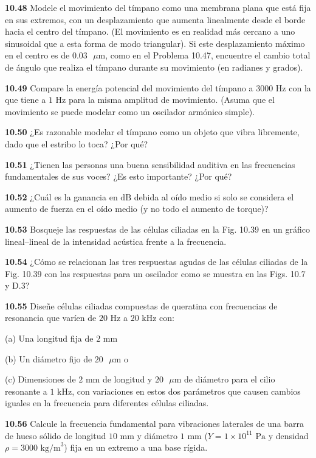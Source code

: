 \documentclass[12pt]{book}
\begin{document}
\noindent \textbf{10.48} Modele el movimiento del tímpano como una membrana plana que está fija en sus extremos, con un desplazamiento que aumenta linealmente desde el borde hacia el centro del tímpano. (El movimiento es en realidad más cercano a uno sinusoidal que a esta forma de modo triangular). Si este desplazamiento máximo en el centro es de $0.03\text{ }\mu\text{m}$, como en el Problema 10.47, encuentre el cambio total de ángulo que realiza el tímpano durante su movimiento (en radianes y grados).

\noindent \textbf{10.49} Compare la energía potencial del movimiento del tímpano a $3000\text{ Hz}$ con la que tiene a $1\text{ Hz}$ para la misma amplitud de movimiento. (Asuma que el movimiento se puede modelar como un oscilador armónico simple).

\noindent \textbf{10.50} ¿Es razonable modelar el tímpano como un objeto que vibra libremente, dado que el estribo lo toca? ¿Por qué?

\noindent \textbf{10.51} ¿Tienen las personas una buena sensibilidad auditiva en las frecuencias fundamentales de sus voces? ¿Es esto importante? ¿Por qué?

\noindent \textbf{10.52} ¿Cuál es la ganancia en $\text{dB}$ debida al oído medio si solo se considera el aumento de fuerza en el oído medio (y no todo el aumento de torque)?

\noindent \textbf{10.53} Bosqueje las respuestas de las células ciliadas en la Fig. 10.39 en un gráfico lineal--lineal de la intensidad acústica frente a la frecuencia.

\noindent \textbf{10.54} ¿Cómo se relacionan las tres respuestas agudas de las células ciliadas de la Fig. 10.39 con las respuestas para un oscilador como se muestra en las Figs. 10.7 y D.3?

\noindent \textbf{10.55} Diseñe células ciliadas compuestas de queratina con frecuencias de resonancia que varíen de $20\text{ Hz}$ a $20\text{ kHz}$ con:

(a) Una longitud fija de $2\text{ mm}$

(b) Un diámetro fijo de $20\text{ }\mu\text{m}$ o

(c) Dimensiones de $2\text{ mm}$ de longitud y $20\text{ }\mu\text{m}$ de diámetro para el cilio resonante a $1\text{ kHz}$, con variaciones en estos dos parámetros que causen cambios iguales en la frecuencia para diferentes células ciliadas.

\noindent \textbf{10.56} Calcule la frecuencia fundamental para vibraciones laterales de una barra de hueso sólido de longitud $10\text{ mm}$ y diámetro $1\text{ mm}$ ($Y = 1 \times 10^{11}\text{ Pa}$ y densidad $\rho = 3000\text{ kg/m}^3$) fija en un extremo a una base rígida.
\end{document}
